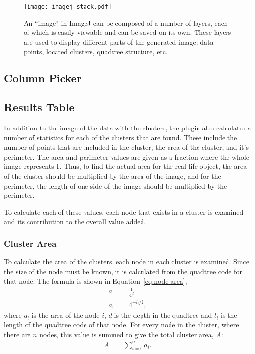 \begin{figure}[tbhp]
	\centering
	\texttt{[image: imagej-stack.pdf]}
	\caption{An ``image'' in ImageJ can be composed of a number of layers, each
		of which is easily viewable and can be saved on its own. These layers
		are used to display different parts of the generated image: data
		points, located clusters, quadtree structure, etc.}
	\label{fig:imagej-stack}
\end{figure}

\subsection{Column Picker}
\label{sub:column_picker}


\subsection{Results Table}
\label{sub:results_table}

In addition to the image of the data with the clusters, the plugin also
calculates a number of statistics for each of the clusters that are found.
These include the number of points that are included in the cluster, the area
of the cluster, and it's perimeter. The area and perimeter values are given as
a fraction where the whole image represents 1. Thus, to find the actual area
for the real life object, the area of the cluster should be multiplied by the
area of the image, and for the perimeter, the length of one side of the image
should be multiplied by the perimeter.

To calculate each of these values, each node that exists in a cluster is
examined and its contribution to the overall value added.

\subsubsection{Cluster Area}
\label{ssub:Cluster Area}

To calculate the area of the clusters, each node in each cluster is examined.
Since the size of the node must be known, it is calculated from the quadtree
code for that node. The formula is shown in Equation~\ref{eq:node-area},
\begin{align}
	a &= \frac{1}{4^{d}} \\
	a_i &= 4^{-l_i/2}, \label{eq:node-area}
\end{align}
where $a_i$ is the area of the node $i$, $d$ is the depth in the quadtree and
$l_i$ is the length of the quadtree code of that node. For every node in the
cluster, where there are $n$ nodes, this value is summed to give the total
cluster area, $A$:
\begin{align}
	A &= \sum_{i=0}^{n} a_i.
\end{align}

